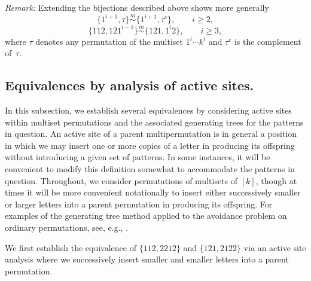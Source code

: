 \documentclass[11pt]{amsart}
\theoremstyle{plain}
\theoremstyle{definition}
\newcommand{\csim}{\stackrel{m}{\sim}}
\begin{document}
\emph{Remark:} Extending the bijections described above shows more generally
 $$\{1^{i+1},\tau\}\csim\{1^{i+1},\tau^c\}, \qquad i \geq 2,$$
$$\{112,121^{i-1}\}\csim\{121,1^i2\}, \qquad i \geq 3,$$
where $\tau$ denotes any permutation of the multiset $1^i\cdots k^i$ and $\tau^c$ is the
complement of~$\tau$.

\subsection{Equivalences by analysis of active sites.}

In this subsection, we establish several equivalences by considering active sites within multiset
permutations and the associated generating trees for the patterns in question.  An active site of a
parent multipermutation is in general a position in which we may insert one or more copies of a
letter in producing its offspring without introducing a given set of patterns.  In some instances, it
will be convenient to modify this definition somewhat to accommodate the patterns in question.  Throughout, we consider permutations of multisets of $[k]$, though at times it will be more convenient notationally to insert either successively smaller or larger letters into a parent permutation in producing its offspring.  For examples of the generating tree method applied to the avoidance problem on ordinary
permutations, see, e.g., \cite{JW1,JW2}.

We first establish the equivalence of $\{112,2212\}$ and $\{121,2122\}$ via an active site analysis where we successively insert smaller and smaller letters into a parent permutation.
\end{document}
